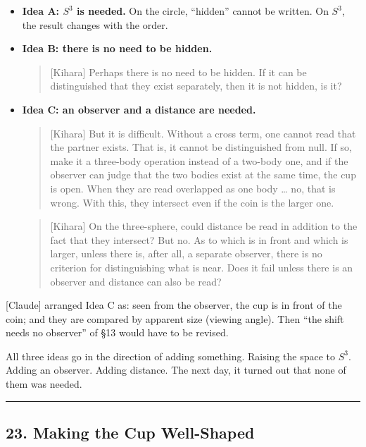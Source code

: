 \documentclass[
  a4paper,
]{article}
\newcounter{none} %
\begin{document}
\begin{itemize}
\item
  \textbf{Idea A: \(S^3\) is needed.} On the circle, ``hidden'' cannot
  be written. On \(S^3\), the result changes with the order.
\item
  \textbf{Idea B: there is no need to be hidden.}

  \begin{quote}
  {[}Kihara{]} Perhaps there is no need to be hidden. If it can be
  distinguished that they exist separately, then it is not hidden, is
  it?
  \end{quote}
\item
  \textbf{Idea C: an observer and a distance are needed.}

  \begin{quote}
  {[}Kihara{]} But it is difficult. Without a cross term, one cannot
  read that the partner exists. That is, it cannot be distinguished from
  null. If so, make it a three-body operation instead of a two-body one,
  and if the observer can judge that the two bodies exist at the same
  time, the cup is open. When they are read overlapped as one body
  \ldots{} no, that is wrong. With this, they intersect even if the coin
  is the larger one.
  \end{quote}

  \begin{quote}
  {[}Kihara{]} On the three-sphere, could distance be read in addition
  to the fact that they intersect? But no. As to which is in front and
  which is larger, unless there is, after all, a separate observer,
  there is no criterion for distinguishing what is near. Does it fail
  unless there is an observer and distance can also be read?
  \end{quote}
\end{itemize}

{[}Claude{]} arranged Idea C as: seen from the observer, the cup is in
front of the coin; and they are compared by apparent size (viewing
angle). Then ``the shift needs no observer'' of §13 would have to be
revised.

All three ideas go in the direction of adding something. Raising the
space to \(S^3\). Adding an observer. Adding distance. The next day, it
turned out that none of them was needed.

\begin{center}\rule{0.5\linewidth}{0.5pt}\end{center}

\subsection{23. Making the Cup
Well-Shaped}\label{making-the-cup-well-shaped}
\end{document}
